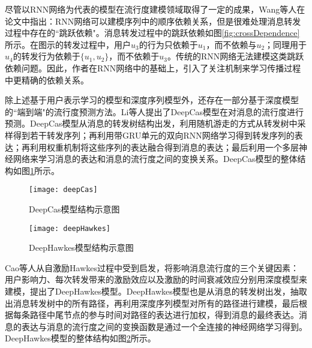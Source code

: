 尽管以RNN网络为代表的模型在流行度建模领域取得了一定的成果，Wang等人\citep{wang2017cascade}在论文中指出：RNN网络可以建模序列中的顺序依赖关系，但是很难处理消息转发过程中存在的``跳跃依赖"。消息转发过程中的跳跃依赖如图\ref{fig:crossDependence}所示。在图示的转发过程中，用户$u_3$的行为只依赖于$u_1$，而不依赖与$u_2$；同理用于$u_4$的转发行为依赖于$\{u_1,u_2\}$，而不依赖于$u_3$。传统的RNN网络无法建模这类跳跃依赖问题。因此，作者在RNN网络中的基础上，引入了关注机制\citep{bahdanau2014neural}来学习传播过程中更精确的依赖关系。

除上述基于用户表示学习的模型和深度序列模型外，还存在一部分基于深度模型的``端到端"的流行度预测方法。Li等人\citep{li2017deepcas}提出了DeepCas模型在对消息的流行度进行预测。DeepCas模型从消息的转发树结构出发，利用随机游走\citep{spitzer2013principles}的方式从转发树中采样得到若干转发序列；再利用带GRU单元的双向RNN网络学习得到转发序列的表达；再利用权重机制将这些序列的表达融合得到消息的表达；最后利用一个多层神经网络来学习消息的表达和消息的流行度之间的变换关系。DeepCas模型的整体结构如图\ref{fig:deepCas}所示。
\begin{figure}[!htbp]
  \centering
  \texttt{[image: deepCas]}
  \caption{DeepCas模型结构示意图\citep{li2017deepcas}}
  \label{fig:deepCas}
\end{figure}
\begin{figure}[!htbp]
  \centering
  \texttt{[image: deepHawkes]}
  \caption{DeepHawkes模型结构示意图\citep{cao2017deep}}
  \label{fig:deepHawkes}
\end{figure}

Cao等人\citep{cao2017deep}从自激励Hawkes过程中受到启发，将影响消息流行度的三个关键因素：用户影响力、每次转发带来的激励效应以及激励的时间衰减效应分别用深度模型来建模，提出了DeepHawkes模型。DeepHawkes模型也是从消息的转发树出发，抽取出消息转发树中的所有路径，再利用深度序列模型对所有的路径进行建模，最后根据每条路径中尾节点的参与时间对路径的表达进行加权，得到消息的最终表达。消息的表达与消息的流行度之间的变换函数是通过一个全连接的神经网络学习得到。DeepHawkes模型的整体结构如图\ref{fig:deepHawkes}所示。


